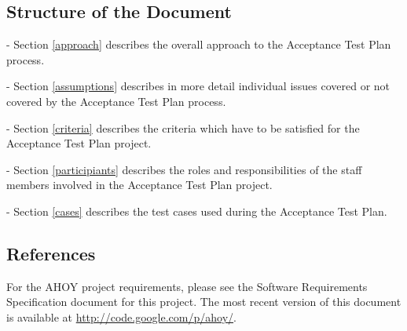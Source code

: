 \documentclass[titlepage]{article}
\begin{document}
\subsection{Structure of the Document%
    \label{structure}%
}
    \begin{itemize*}
        \item[-]Section \ref{approach} describes the overall approach to the Acceptance Test Plan process.
        \item[-]Section \ref{assumptions} describes in more detail individual issues covered or not covered by the Acceptance Test Plan process.
        \item[-]Section \ref{criteria} describes the criteria which have to be satisfied for the Acceptance Test Plan project.
        \item[-]Section \ref{participiants} describes the roles and responsibilities of the staff members involved in the Acceptance Test Plan project.
        \item[-]Section \ref{cases} describes the test cases used during the Acceptance Test Plan.
    \end{itemize*}


\subsection{References%
    \label{references}%
}
    For the AHOY project requirements, please see the Software Requirements Specification document for this project. The most recent version of this document is available at \url{http://code.google.com/p/ahoy/}.

\end{document}
